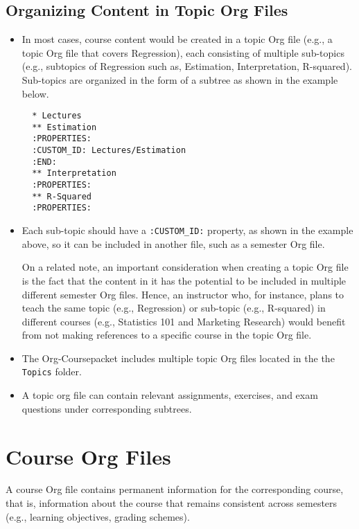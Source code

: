 \documentclass[10pt,article]{article}
\begin{document}
\subsection{Organizing Content in Topic Org Files}
\label{sec:orgb2ea230}
\begin{itemize}
\item In most cases, course content would be created in a topic Org file (e.g., a
topic Org file that covers Regression), each consisting of multiple
sub-topics (e.g., subtopics of Regression such as, Estimation, Interpretation, R-squared). Sub-topics are
organized in the form of a subtree as shown in the example below.

\begin{verbatim}
  * Lectures
  ** Estimation
  :PROPERTIES:
  :CUSTOM_ID: Lectures/Estimation
  :END:
  ** Interpretation
  :PROPERTIES:
  ** R-Squared
  :PROPERTIES:
\end{verbatim}

\item Each sub-topic should have a \texttt{:CUSTOM\_ID:} property, as shown in the example
above, so it can be included in another file, such as a semester Org file.

\begin{mdframed}
On a related note, an important consideration when creating a topic
Org file is the fact that the content in it has the potential to be
included in multiple different semester Org files. Hence, an
instructor who, for instance, plans to teach the same topic (e.g.,
Regression) or sub-topic (e.g., R-squared) in different courses
(e.g., Statistics 101 and Marketing Research) would benefit from not
making references to a specific course in the topic Org file.
\end{mdframed}

\item The Org-Coursepacket includes multiple topic Org files located in the the
\texttt{Topics} folder.
\item A topic org file can contain relevant assignments, exercises, and exam
questions under corresponding subtrees.
\end{itemize}
\section{Course Org Files}
\label{sec:orgcfcb29a}
A course Org file contains permanent information for the corresponding
course, that is, information about the course that remains consistent across semesters
(e.g., learning objectives, grading schemes).
\end{document}
